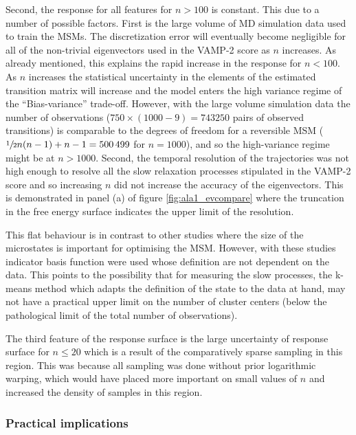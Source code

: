 Second, the response for all features for $n > 100$ is constant. This due to a number of possible factors. First is the large volume of MD simulation data used to train the MSMs. The discretization error will eventually become negligible for all of the  non-trivial eigenvectors used in the VAMP-2 score as $n$ increases. As already mentioned, this explains the rapid increase in the response for $n<100$. As $n$ increases the statistical uncertainty in the elements of the estimated transition matrix will increase and the model enters the high variance regime of the ``Bias-variance'' trade-off.  However, with the large volume simulation data the number of observations ($750\times(1000-9) = \num{743250}$ pairs of observed transitions) is comparable to the degrees of freedom for a reversible MSM ($\sfrac{1}{2}n(n-1)+n-1=\num{500499}$ for $n=1000$), and so the high-variance regime might be at $n>1000$. Second, the temporal resolution of the trajectories was not high enough to resolve all the slow relaxation processes stipulated in the VAMP-2 score and so increasing $n$ did not increase the accuracy of the eigenvectors.  This is demonstrated in panel (a) of figure \ref{fig:ala1_evcompare} where the truncation in the free energy surface indicates the upper limit of the resolution. 

This flat behaviour is in contrast to other studies \cite{mcgibbonVariationalCrossvalidationSlow2015,wuVariationalApproachLearning2020c,prinzMarkovModelsMolecular2011} where the size of the microstates is important for optimising the MSM. However, with these studies indicator basis function were used whose definition are not dependent on the data. This points to the possibility that for measuring the slow processes, the k-means method which adapts the definition of the state to the data at hand, may not have a practical upper limit on the number of cluster centers (below the pathological limit of the total number of observations). 

The third feature of the response surface is the large uncertainty of response surface for $n \leq 20$ which is a result of the comparatively sparse sampling in this region. This was because all sampling was done without prior logarithmic warping, which would have placed more important on small values of $n$ and increased the density of samples in this region.  
 
\subsubsection{Practical implications}

